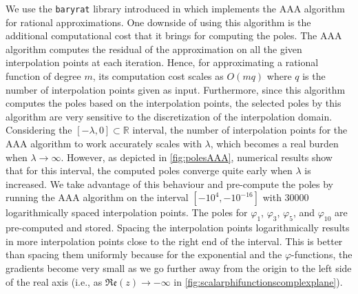 We use the \texttt{baryrat} library introduced in \cite{hofreither2021BRASIL} which implements
the AAA algorithm for rational approximations. One downside of using this algorithm
is the additional computational cost that it brings for computing the poles.
The AAA algorithm  computes the residual of the approximation on all the given interpolation points at
each iteration. Hence, for approximating a rational function of degree $m$, its computation cost scales
as $O(mq)$ where $q$ is the number of interpolation points given as input.
Furthermore, since this algorithm computes the poles based on the interpolation points, the
selected poles by this algorithm are very sensitive to the discretization of the interpolation domain.
Considering the $[-\lambda, 0] \subset \mathbb{R}$ interval, the number of interpolation
points for the AAA algorithm to work accurately scales with $\lambda$, which becomes a real burden
when $\lambda \to \infty$. However, as depicted in \autoref{fig:polesAAA}, numerical results show that
for this interval, the computed poles converge quite early when $\lambda$ is increased. We take
advantage of this behaviour and pre-compute the poles by running the AAA algorithm
on the interval $[-10^{4}, -10^{-16}]$ with $30000$ logarithmically spaced interpolation points.
The poles for $\varphi_1$, $\varphi_3$, $\varphi_5$, and $\varphi_{10}$ are pre-computed and stored.
Spacing the interpolation points logarithmically results in more interpolation points close to
the right end of the interval. This is better than spacing them uniformly because for the
exponential and the $\varphi$-functions, the gradients become very small as we go further away
from the origin to the left side of the real axis (i.e.,
as $\mathfrak{Re}(z) \to -\infty$ in \autoref{fig:scalarphifunctionscomplexplane}).

